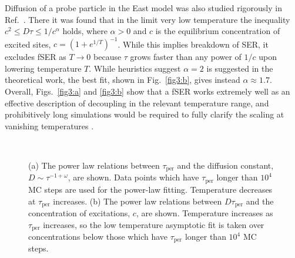 \documentclass[showpacs,pre,aps,twocolumn,superscriptaddress]{revtex4-1}
\begin{document}
Diffusion of a probe particle in the East model was also studied rigorously in Ref.~\cite{Blondel2014}.  There it was found that in the limit very low temperature the inequality $c^2 \leq D\tau \leq 1/c^{\alpha}$ holds, where $\alpha > 0$ and $c$ is the equilibrium concentration of excited sites, $c = (1+e^{1/T})^{-1}$.
While this implies breakdown of SER, it excludes fSER as $T \rightarrow 0$ because $\tau$ grows faster than any power of $1/c$ upon lowering temperature $T$.  While heuristics suggest $\alpha=2$ is suggested in the theoretical work, the best fit, shown in Fig.~\ref{fig3:b}, gives instead $\alpha \approx 1.7$.  Overall,  Figs.~\ref{fig3:a} and \ref{fig3:b} show that a fSER works extremely well as an effective description of decoupling in the relevant temperature range, and prohibitively long simulations would be required to fully clarify the scaling at vanishing temperatures \cite{Jung2013}.


\begin{figure}[t]
 \begin{center}
  \mbox{
     \hspace{-40pt}
     \hspace{-120pt}
 }
  
 \end{center}
     \vspace{-10pt}
 \caption{\label{fig4} (a) The power law relations between ${\tau}_{\text{per}}$ and the diffusion constant, $D\sim{\tau}^{-1+\omega}$, are shown. 
                       Data points which have ${\tau}_{\text{per}}$ longer than $10^4$ MC steps are used for the power-law fitting. Temperature
                       decreases at $\tau_\text{per}$ increases.
                      (b) The power law relations between $D\tau_\text{per}$ and the concentration of excitations, $c$, are shown. 
                       Temperature increases as $\tau_\text{per}$ increases, so the low temperature asymptotic fit is taken over concentrations below 
                       those which have $\tau_\text{per}$ longer than $10^4$ MC steps.
                        }
\end{figure}
\end{document}

